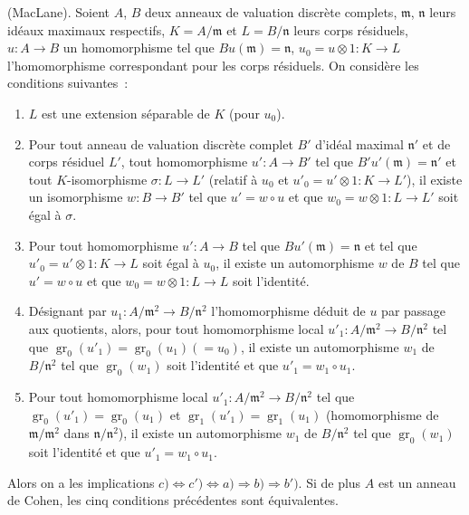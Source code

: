 \begin{proposition}[21.5.2]
\label{0.21.5.2-fr}
\textnormal{(MacLane).}
Soient $A$, $B$ deux anneaux de valuation discrète complets, $\mathfrak m$,
$\mathfrak n$ leurs idéaux maximaux respectifs, $K=A/\mathfrak m$ et
$L=B/\mathfrak n$ leurs corps résiduels, $u:A\to B$ un homomorphisme tel que
$Bu(\mathfrak m)=\mathfrak n$, $u_0=u\otimes 1:K\to L$ l'homomorphisme
correspondant pour les corps résiduels. On considère les conditions suivantes~:
\begin{enumerate}
  \item[\rm a)] $L$ est une extension séparable de $K$ (pour $u_0$).
  \item[\rm b)] Pour tout anneau de valuation discrète complet $B'$ d'idéal
  maximal $\mathfrak n'$ et de corps résiduel $L'$,
  tout homomorphisme
  $u':A\to B'$ tel que $B'u'(\mathfrak m)=\mathfrak n'$ et tout
  $K$-isomorphisme $\sigma:L\to L'$ (relatif à $u_0$ et
  $u'_0=u'\otimes1:K\to L'$), il existe un isomorphisme $w:B\to B'$ tel que
  $u'=w\circ u$ et que $w_0=w\otimes1:L\to L'$ soit égal à $\sigma$.
  \item[\rm b$'$)] Pour tout homomorphisme $u':A\to B$ tel que
  $Bu'(\mathfrak m)=\mathfrak n$ et tel que $u'_0=u'\otimes1:K\to L$ soit égal
  à $u_0$, il existe un automorphisme $w$ de $B$ tel que $u'=w\circ u$ et que
  $w_0=w\otimes1:L\to L$ soit l'identité.
  \item[\rm c)] Désignant par $u_1:A/\mathfrak m^2\to B/\mathfrak n^2$
  l'homomorphisme déduit de $u$ par passage aux quotients, alors, pour tout
  homomorphisme local $u'_1:A/\mathfrak m^2\to B/\mathfrak n^2$ tel que
  $\operatorname{gr}_0(u'_1)=\operatorname{gr}_0(u_1)(=u_0)$, il existe un
  automorphisme $w_1$ de $B/\mathfrak n^2$ tel que
  $\operatorname{gr}_0(w_1)$ soit l'identité et que $u'_1=w_1\circ u_1$.
  \item[\rm c$'$)] Pour tout homomorphisme local $u'_1:A/\mathfrak m^2\to
  B/\mathfrak n^2$ tel que $\operatorname{gr}_0(u'_1)=\operatorname{gr}_0(u_1)$
  et $\operatorname{gr}_1(u'_1)=\operatorname{gr}_1(u_1)$
  (homomorphisme de $\mathfrak m/\mathfrak m^2$ dans
  $\mathfrak n/\mathfrak n^2$), il existe un automorphisme $w_1$ de
  $B/\mathfrak n^2$ tel que $\operatorname{gr}_0(w_1)$ soit l'identité et que
  $u'_1=w_1\circ u_1$.
\end{enumerate}
 Alors on a les implications $c)\Leftrightarrow c')\Leftrightarrow a)\Rightarrow b)
 \Rightarrow b')$. Si de plus $A$ est un anneau de Cohen, les cinq conditions
précédentes sont équivalentes.

\end{proposition}
